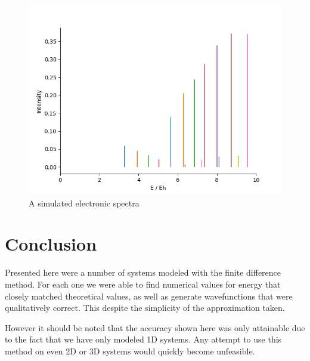\documentclass{article}
\begin{document}
\begin{figure}[h]
\centering
	\includegraphics[width=.75\linewidth]{images/simulate.png}
	\caption{A simulated electronic spectra }
	\label{fig:spectra}
\end{figure}

\newpage
\section*{Conclusion}
Presented here were a number of systems modeled with the finite difference method. For each one we were able to find numerical values for energy that closely matched theoretical values, as well as generate wavefunctions that were qualitatively correct. This despite the simplicity of the approximation taken.


However it should be noted that the accuracy shown here was only attainable due to the fact that we have only modeled 1D systems. Any attempt to use this method on even 2D or 3D systems would quickly become unfeasible. 
\end{document}
